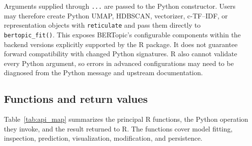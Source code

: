 \documentclass[12pt]{article}
\newcommand{\pkg}[1]{\texttt{#1}}
\newcommand{\code}[1]{\texttt{#1}}
\begin{document}
Arguments supplied through \code{...} are passed to the Python constructor. Users may therefore create Python UMAP, HDBSCAN, vectorizer, c-TF--IDF, or representation objects with \pkg{reticulate} and pass them directly to \code{bertopic\_fit()}. This exposes BERTopic's configurable components within the backend versions explicitly supported by the R package. It does not guarantee forward compatibility with changed Python signatures. R also cannot validate every Python argument, so errors in advanced configurations may need to be diagnosed from the Python message and upstream documentation.

\subsection{Functions and return values}

Table~\ref{tab:api_map} summarizes the principal R functions, the Python operation they invoke, and the result returned to R. The functions cover model fitting, inspection, prediction, visualization, modification, and persistence.
\end{document}
